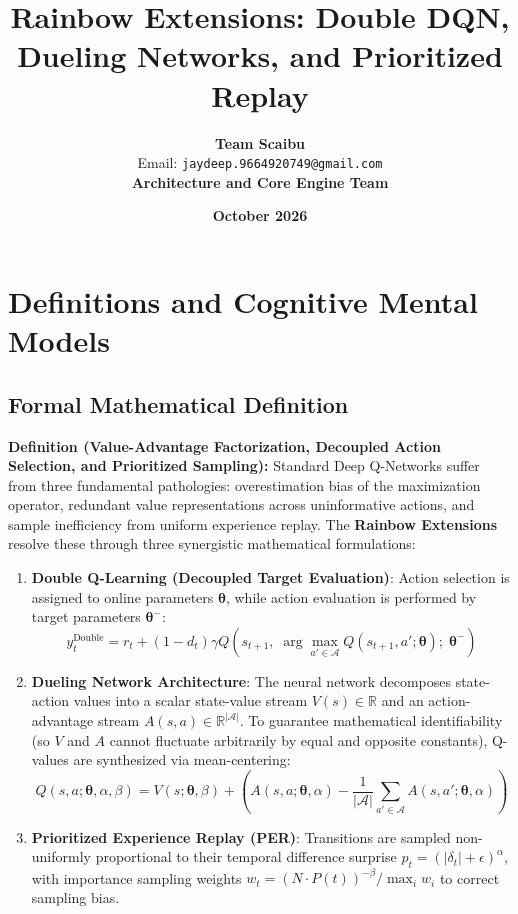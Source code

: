 \documentclass[11pt,a4paper]{article}
\title{\textbf{Rainbow Extensions: Double DQN, Dueling Networks, and Prioritized Replay}}
\author{\textbf{Team Scaibu} \\ \small Email: \texttt{jaydeep.9664920749@gmail.com} \\ \small \textbf{Architecture and Core Engine Team}}
\date{\textbf{October 2026}}
\theoremstyle{definition}
\begin{document}
\maketitle

\section{Definitions and Cognitive Mental Models}

\subsection{Formal Mathematical Definition}
\textbf{Definition (Value-Advantage Factorization, Decoupled Action Selection, and Prioritized Sampling):}
Standard Deep Q-Networks suffer from three fundamental pathologies: overestimation bias of the maximization operator, redundant value representations across uninformative actions, and sample inefficiency from uniform experience replay. The \textbf{Rainbow Extensions} resolve these through three synergistic mathematical formulations:

\begin{enumerate}
    \item \textbf{Double Q-Learning (Decoupled Target Evaluation)}: Action selection is assigned to online parameters $\boldsymbol{\theta}$, while action evaluation is performed by target parameters $\boldsymbol{\theta}^-$:
    {\boldmath
    \begin{equation}
    y_t^{\text{Double}} = r_t + (1 - d_t) \gamma Q\left( s_{t+1}, \; \arg\max_{a' \in \mathcal{A}} Q(s_{t+1}, a'; \boldsymbol{\theta}); \; \boldsymbol{\theta}^- \right)
    \end{equation}
    }
    \item \textbf{Dueling Network Architecture}: The neural network decomposes state-action values into a scalar state-value stream $V(s) \in \mathbb{R}$ and an action-advantage stream $A(s, a) \in \mathbb{R}^{|\mathcal{A}|}$. To guarantee mathematical identifiability (so $V$ and $A$ cannot fluctuate arbitrarily by equal and opposite constants), Q-values are synthesized via mean-centering:
    {\boldmath
    \begin{equation}
    Q(s, a; \boldsymbol{\theta}, \alpha, \beta) = V(s; \boldsymbol{\theta}, \beta) + \left( A(s, a; \boldsymbol{\theta}, \alpha) - \frac{1}{|\mathcal{A}|}\sum_{a' \in \mathcal{A}} A(s, a'; \boldsymbol{\theta}, \alpha) \right)
    \end{equation}
    }
    \item \textbf{Prioritized Experience Replay (PER)}: Transitions are sampled non-uniformly proportional to their temporal difference surprise $p_t = (|\delta_t| + \epsilon)^\alpha$, with importance sampling weights $w_t = \left( N \cdot P(t) \right)^{-\beta} / \max_i w_i$ to correct sampling bias.
\end{enumerate}
\end{document}
